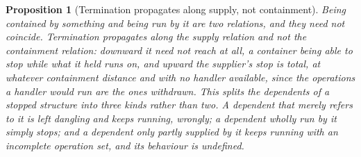 \documentclass[11pt,a4paper]{article}
\newtheorem{proposition}[definition]{Proposition}
\theoremstyle{remark}\newtheorem{remark}[definition]{Remark}
\begin{document}
\begin{proposition}[Termination propagates along supply, not containment]\label{prop:termination-supply}
Being contained by something and being run by it are two relations, and they need not coincide.
Termination propagates along the supply relation and not the containment relation: downward it need not
reach at all, a container being able to stop while what it held runs on, and upward the supplier's stop
is total, at whatever containment distance and with no handler available, since the operations a
handler would run are the ones withdrawn. This splits the dependents of a stopped structure into three
kinds rather than two. A dependent that merely \emph{refers} to it is left dangling and keeps running,
wrongly; a dependent \emph{wholly run by} it simply stops; and a dependent only \emph{partly} supplied
by it keeps running with an incomplete operation set, and its behaviour is undefined.
\end{proposition}
\end{document}
